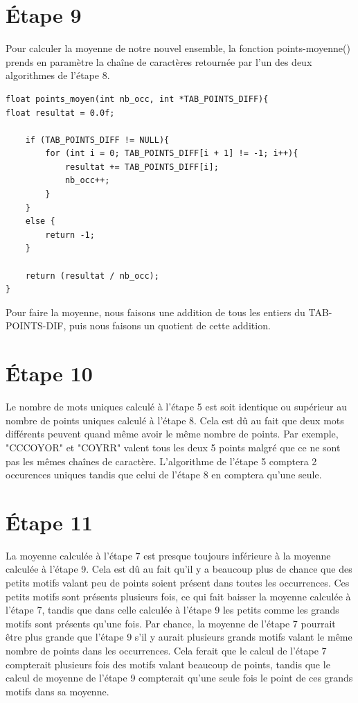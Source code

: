 \documentclass{article}
\begin{document}
\section*{Étape 9}
Pour calculer la moyenne de notre nouvel ensemble, la fonction points-moyenne() prends en paramètre la chaîne de caractères retournée par l'un des deux algorithmes de l'étape 8.
\begin{lstlisting}[style=Cstyle]
float points_moyen(int nb_occ, int *TAB_POINTS_DIFF){
float resultat = 0.0f;

    if (TAB_POINTS_DIFF != NULL){
        for (int i = 0; TAB_POINTS_DIFF[i + 1] != -1; i++){
            resultat += TAB_POINTS_DIFF[i];
            nb_occ++;
        }
    }
    else {
        return -1;
    }

    return (resultat / nb_occ);
}
\end{lstlisting}
Pour faire la moyenne, nous faisons une addition de tous les entiers du TAB-POINTS-DIF, puis nous faisons un quotient de cette addition.
\section*{Étape 10}
Le nombre de mots uniques calculé à l'étape 5 est soit identique ou supérieur au nombre de points uniques calculé à l'étape 8. Cela est dû au fait que deux mots différents peuvent quand même avoir le même nombre de points. Par exemple, "CCCOYOR" et "COYRR" valent tous les deux 5 points malgré que ce ne sont pas les mêmes chaînes de caractère. L'algorithme de l'étape 5 comptera 2 occurences uniques tandis que celui de l'étape 8 en comptera qu'une seule.
\section*{Étape 11}
La moyenne calculée à l'étape 7 est presque toujours inférieure à la moyenne calculée à l'étape 9. Cela est dû au fait qu'il y a beaucoup plus de chance que des petits motifs valant peu de points soient présent dans toutes les occurrences. Ces petits motifs sont présents plusieurs fois, ce qui fait baisser la moyenne calculée à l'étape 7, tandis que dans celle calculée à l'étape 9 les petits comme les grands motifs sont présents qu'une fois. Par chance, la moyenne de l'étape 7 pourrait être plus grande que l'étape 9 s'il y aurait plusieurs grands motifs valant le même nombre de points dans les occurrences. Cela ferait que le calcul de l'étape 7 compterait plusieurs fois des motifs valant beaucoup de points, tandis que le calcul de moyenne de l'étape 9 compterait qu'une seule fois le point de ces grands motifs dans sa moyenne.
\end{document}
